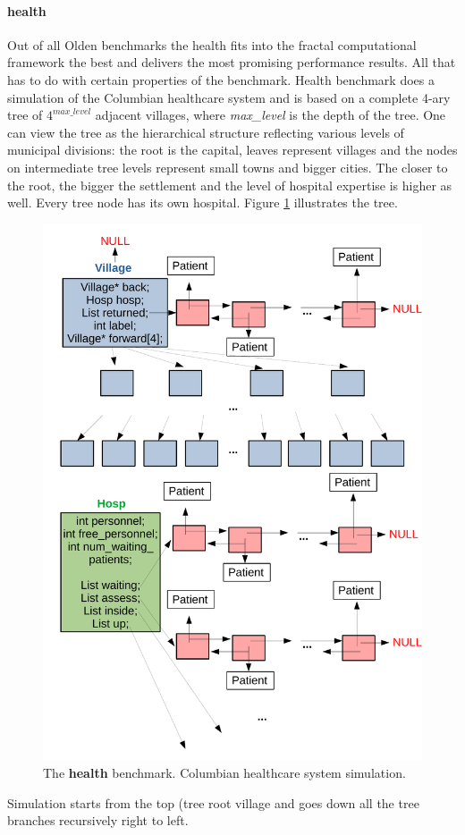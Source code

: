 \paragraph{health} Out of all Olden benchmarks the health fits into the fractal computational framework the best and delivers the most promising performance results. All that has to do with certain properties of the benchmark. Health benchmark does a simulation of the Columbian healthcare system and is based on a complete 4-ary tree of $4^{max\_level}$ adjacent villages, where \textit{max\_level} is the depth of the tree. One can view the tree as the hierarchical structure reflecting various levels of municipal divisions: the root is the capital, leaves represent villages and the nodes on intermediate tree levels represent small towns and bigger cities. The closer to the root, the bigger the settlement and the level of hospital expertise is higher as well. Every tree node has its own hospital. Figure \ref{fig:health_benchmark} illustrates the tree. 
\begin{figure}[ht]
\includegraphics[width=1.0\textwidth]{images/village_tree.pdf}
\caption{The \textbf{health} benchmark. Columbian healthcare system simulation.}
\label{fig:health_benchmark}
\end{figure}
\quad Simulation starts from the top (tree root village and goes down all the tree branches recursively right to left.




